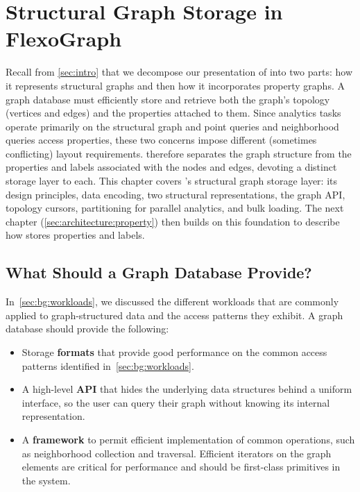 \chapter{Structural Graph Storage in FlexoGraph}
\label{sec:architecture:structural}

Recall from \autoref{sec:intro} that we decompose our presentation of \project{} into two parts: how it represents structural graphs and then how it incorporates property graphs.
A graph database must efficiently store and retrieve both the graph's topology (vertices and edges) and the properties attached to them.
Since analytics tasks operate primarily on the structural graph and point queries and neighborhood queries access properties, these two concerns impose different (sometimes conflicting) layout requirements.
\project{} therefore separates the graph structure from the properties and labels associated with the nodes and edges, devoting a distinct storage layer to each.
This chapter covers \project{}'s structural graph storage layer: its design principles, data encoding, two structural representations, the graph API, topology cursors, partitioning for parallel analytics, and bulk loading.
The next chapter (\autoref{sec:architecture:property}) then builds on this foundation to describe how \project{} stores properties and labels.

\section{What Should a Graph Database Provide?}
\label{arch:requirements}

In~\autoref{sec:bg:workloads}, we discussed the different workloads that are commonly applied to graph-structured data and the access patterns they exhibit.
A graph database should provide the following:
\begin{itemize}
\item Storage \textbf{formats} that provide good performance on the common access patterns identified in~\autoref{sec:bg:workloads}.
\item A high-level \textbf{API} that hides the underlying data structures behind a uniform interface, so the user can query their graph without knowing its internal representation.
\item A \textbf{framework} to permit efficient implementation of common operations, such as neighborhood collection and traversal. Efficient iterators on the graph elements are critical for performance and should be first-class primitives in the system.
\end{itemize}

